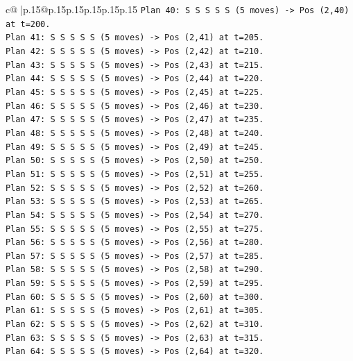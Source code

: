 \documentclass{article}
\begin{document}
{\begin{supertabular}{c@{$\;$}|p{.15\linewidth}@{}p{.15\linewidth}p{.15\linewidth}p{.15\linewidth}p{.15\linewidth}p{.15\linewidth}}
{{{\texttt{Plan 40: S S S S S (5 moves) {-}> Pos (2,40) at t=200.} \\
\texttt{Plan 41: S S S S S (5 moves) {-}> Pos (2,41) at t=205.} \\
\texttt{Plan 42: S S S S S (5 moves) {-}> Pos (2,42) at t=210.} \\
\texttt{Plan 43: S S S S S (5 moves) {-}> Pos (2,43) at t=215.} \\
\texttt{Plan 44: S S S S S (5 moves) {-}> Pos (2,44) at t=220.} \\
\texttt{Plan 45: S S S S S (5 moves) {-}> Pos (2,45) at t=225.} \\
\texttt{Plan 46: S S S S S (5 moves) {-}> Pos (2,46) at t=230.} \\
\texttt{Plan 47: S S S S S (5 moves) {-}> Pos (2,47) at t=235.} \\
\texttt{Plan 48: S S S S S (5 moves) {-}> Pos (2,48) at t=240.} \\
\texttt{Plan 49: S S S S S (5 moves) {-}> Pos (2,49) at t=245.} \\
\texttt{Plan 50: S S S S S (5 moves) {-}> Pos (2,50) at t=250.} \\
\texttt{Plan 51: S S S S S (5 moves) {-}> Pos (2,51) at t=255.} \\
\texttt{Plan 52: S S S S S (5 moves) {-}> Pos (2,52) at t=260.} \\
\texttt{Plan 53: S S S S S (5 moves) {-}> Pos (2,53) at t=265.} \\
\texttt{Plan 54: S S S S S (5 moves) {-}> Pos (2,54) at t=270.} \\
\texttt{Plan 55: S S S S S (5 moves) {-}> Pos (2,55) at t=275.} \\
\texttt{Plan 56: S S S S S (5 moves) {-}> Pos (2,56) at t=280.} \\
\texttt{Plan 57: S S S S S (5 moves) {-}> Pos (2,57) at t=285.} \\
\texttt{Plan 58: S S S S S (5 moves) {-}> Pos (2,58) at t=290.} \\
\texttt{Plan 59: S S S S S (5 moves) {-}> Pos (2,59) at t=295.} \\
\texttt{Plan 60: S S S S S (5 moves) {-}> Pos (2,60) at t=300.} \\
\texttt{Plan 61: S S S S S (5 moves) {-}> Pos (2,61) at t=305.} \\
\texttt{Plan 62: S S S S S (5 moves) {-}> Pos (2,62) at t=310.} \\
\texttt{Plan 63: S S S S S (5 moves) {-}> Pos (2,63) at t=315.} \\
\texttt{Plan 64: S S S S S (5 moves) {-}> Pos (2,64) at t=320.} \\
}}}
\end{supertabular}}
\end{document}
